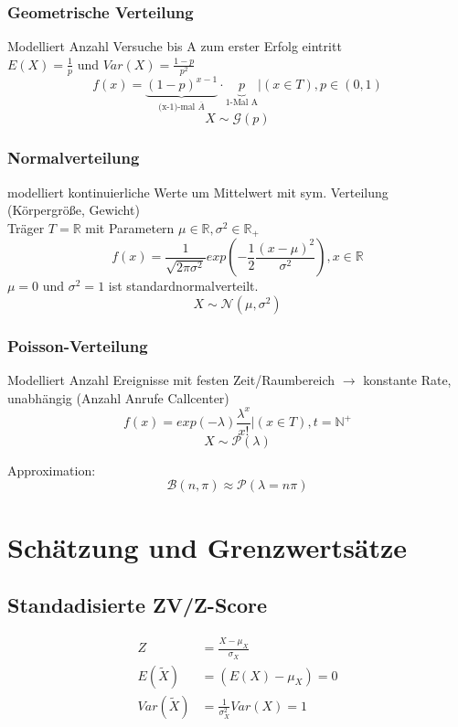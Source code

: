 \documentclass[10pt,a4paper,landscape]{article}
\begin{document}
\begin{multicols}{4}
\subsubsection{Geometrische Verteilung}
Modelliert Anzahl Versuche bis A zum erster Erfolg eintritt\\
$E(X)=\frac{1}{p}$ und $Var(X)=\frac{1-p}{p^2}$
\[
f(x)= \underbrace{(1 - p)^{x-1}}_{\text{(x-1)-mal } \overline{A}}
 \cdot \underbrace{p}_{\text{1-Mal A}}|(x \in T), p \in (0,1)
\]
\[
X \sim \mathcal{G}(p)
\]

\subsubsection{Normalverteilung}
modelliert kontinuierliche Werte um Mittelwert mit sym. Verteilung (Körpergröße, Gewicht) \\
Träger $T=\mathbb{R}$ mit Parametern $\mu \in \mathbb{R}, \sigma^2 \in \mathbb{R}_+$
\[
f(x)=\frac{1}{\sqrt{2 \pi \sigma^2}}exp\left(-\frac{1}{2}\frac{(x-\mu)^2}{\sigma^2}\right), x\in \mathbb{R}
\]
$\mu = 0$ und $\sigma^2 = 1$ ist standardnormalverteilt.
\[
X \sim \mathcal{N}(\mu , \sigma^2)
\]

\subsubsection{Poisson-Verteilung}
Modelliert Anzahl Ereignisse mit festen Zeit/Raumbereich $\rightarrow$ konstante Rate, unabhängig (Anzahl Anrufe Callcenter)
\[
f(x)=exp(-\lambda)\frac{\lambda^x}{x!}|(x \in T), t= \mathbb{N^+}
\]
\[
X \sim \mathcal{P}(\lambda)
\]

Approximation:
\[
\mathcal{B}(n, \pi) \approx \mathcal{P}(\lambda =n\pi)
\]


\section{Schätzung und Grenzwertsätze}

\subsection{Standadisierte ZV/Z-Score}
\begin{align*}
Z &= \frac{X- \mu_X}{\sigma_X} \\
E(\tilde{X}) &= (E(X)-\mu_X)=0 \\
Var(\tilde{X})&=\frac{1}{\sigma^2_X}Var(X) = 1
\end{align*}


\end{multicols}
\end{document}
